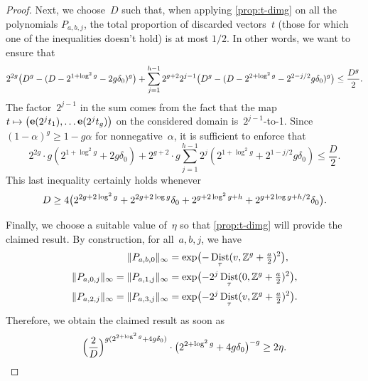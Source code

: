 \documentclass[12pt,oneside]{amsart}
\numberwithin{equation}{section}
\theoremstyle{definition}
\newcommand{\Z}{\mathbb{Z}}
\DeclareMathOperator{\Dist}{Dist}
\DeclareMathOperator{\e}{\mathbf{e}}
\DeclarePairedDelimiter{\paren}{(}{)}
\DeclarePairedDelimiter{\norm}{\|}{\|}
\begin{document}
\begin{proof}
  Next, we choose~$D$ such that, when applying \cref{prop:t-dimg} on all the
  polynomials $P_{a,b,j}$, the total proportion of discarded vectors~$t$ (those
  for which one of the inequalities doesn't hold) is at most $1/2$. In other
  words, we want to ensure that
  \begin{displaymath}
    2^{2g} \paren[\big]{D^g - (D - 2^{1+\log^2 g} - 2g\delta_0)^g}
    + \sum_{j=1}^{h-1} 2^{g+2} 2^{j-1} \paren[\big]{D^g - (D - 2^{2+\log^2 g} - 2^{2 - j/2}g\delta_0)^g}
    \leq \frac{D^g}{2}.
  \end{displaymath}
  The factor~$2^{j-1}$ in the sum comes from the fact that the
  map~$t\mapsto \paren[\big]{\e(2^jt_1),\ldots\e(2^j t_g)}$ on the considered
  domain is~$2^{j-1}$-to-1. Since~$(1-\alpha)^g\geq 1-g\alpha$ for
  nonnegative~$\alpha$, it is sufficient to enforce that
  \begin{displaymath}
    2^{2g} \cdot g(2^{1+\log^2 g} + 2g\delta_0) + 2^{g+2}\cdot g \sum_{j=1}^{h-1} 2^j(2^{1 + \log^2 g} + 2^{1-j/2}g\delta_0) \leq \frac D2.
  \end{displaymath}
  This last inequality certainly holds whenever
  \begin{equation}
    \label{eq:D}
    D \geq 4\paren[\big]{2^{2g+2\log^2 g} + 2^{2g+2\log g}\delta_0 + 2^{g+2\log^2 g + h} + 2^{g + 2\log g + h/2}\delta_0 }.
  \end{equation}

  Finally, we choose a suitable value of~$\eta$ so that \cref{prop:t-dimg} will
  provide the claimed result. By construction, for all~$a,b,j$, we have
  \begin{align*}
    \norm{P_{a,b,0}}_\infty &= \exp\paren[\big]{-\Dist_\tau(v,\Z^g + \tfrac a2)^2},\\
    \norm{P_{a,0,j}}_\infty = \norm{P_{a,1,j}}_\infty &= \exp\paren[\big]{-2^j\Dist_\tau(0,\Z^g + \tfrac a2)^2},\\
    \norm{P_{a,2,j}}_\infty = \norm{P_{a,3,j}}_\infty &= \exp\paren[\big]{-2^j\Dist_\tau(v,\Z^g + \tfrac a2)^2}.
  \end{align*}
  Therefore, we obtain the claimed result as soon as
  \begin{equation}
    \label{eq:eta}
    \paren[\Big]{\frac 2D}^{g(2^{2+\log^2 g} + 4g\delta_0)} \cdot \paren[\big]{2^{2+\log^2 g} + 4g\delta_0}^{-g} \geq 2\eta.
  \end{equation}


\end{proof}
\end{document}
